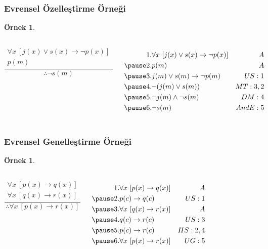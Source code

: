\documentclass[dvipsnames]{beamer}
\theoremstyle{definition}
\theoremstyle{example}
\newtheorem{ornek}[theorem]{Örnek}
\theoremstyle{plain}
\begin{document}
\begin{frame}
  \frametitle{Evrensel Özelleştirme Örneği}

  \begin{ornek}
    \begin{columns}
      \[
      \frac
        {
          \begin{array}{c}
            \forall x~[j(x) \vee s(x) \rightarrow \neg p(x)]\\
            p(m)
          \end{array}
        }
        {
          \therefore \neg s(m)
        }
      \]

      \pause
      \begin{eqnarray*}
        1. & \forall x~[j(x) \vee s(x) \rightarrow \neg p(x)] & A\\\pause
        2. & p(m)                                             & A\\\pause
        3. & j(m) \vee s(m) \rightarrow \neg p(m)             & US:1\\\pause
        4. & \neg (j(m) \vee s(m))                            & MT:3,2\\\pause
        5. & \neg j(m) \wedge \neg s(m)                       & DM:4\\\pause
        6. & \neg s(m)                                        & AndE:5
      \end{eqnarray*}
    \end{columns}
  \end{ornek}
\end{frame}

\begin{frame}
  \frametitle{Evrensel Genelleştirme Örneği}

  \begin{ornek}
    \begin{columns}
      \[
      \frac
        {
          \begin{array}{c}
            \forall x~[p(x) \rightarrow q(x)]\\
            \forall x~[q(x) \rightarrow r(x)]
          \end{array}
        }
        {
          \therefore \forall x~[p(x) \rightarrow r(x)]
        }
      \]

      \pause
      \begin{eqnarray*}
        1. & \forall x~[p(x) \rightarrow q(x)] & A\\\pause
        2. & p(c) \rightarrow q(c)             & US:1\\\pause
        3. & \forall x~[q(x) \rightarrow r(x)] & A\\\pause
        4. & q(c) \rightarrow r(c)             & US:3\\\pause
        5. & p(c) \rightarrow r(c)             & HS:2,4\\\pause
        6. & \forall x~[p(x) \rightarrow r(x)] & UG:5
      \end{eqnarray*}
    \end{columns}
  \end{ornek}
\end{frame}
\end{document}
